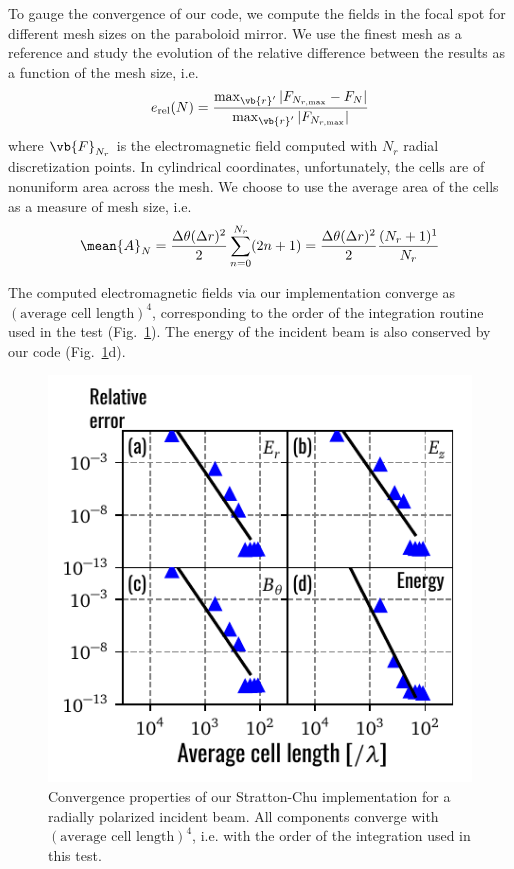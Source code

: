 \documentclass[11pt,SymmetricalJury]{inrsthesis/inrsthesis}
\begin{document}
To gauge the convergence of our code, we compute the fields in the focal spot
for different mesh sizes on the paraboloid mirror. We use the finest mesh
as a reference and study the evolution of the relative difference between
the results as a function of the mesh size, i.e.
  \begin{equation}
    e_\text{rel}(N) = \frac{\max_{\vb{r}'}|F_{N_{r,\text{max}}}-F_{N}|}
                            {\max_{\vb{r}'}|F_{N_{r,\text{max}}}|}
  \end{equation}
where $\vb{F}_{N_r}$ is the electromagnetic field computed with $N_r$
radial discretization points. In cylindrical coordinates, unfortunately,
the cells are of nonuniform area across the mesh. We choose to use the average
area of the cells as a measure of mesh size, i.e.
  \begin{equation}
    \mean{A}_N = \frac{\Delta\theta(\Delta r)^2}{2}\sum_{n=0}^{N_r} (2n+1)
               = \frac{\Delta\theta(\Delta r)^2}{2}\frac{(N_r+1)^1}{N_r}
  \end{equation}

The computed electromagnetic fields via our implementation converge as
$(\text{average cell length})^4$, corresponding to the order of the
integration routine used in the test (Fig.~\ref{fig:sc.convergence-radial}).
The energy of the incident beam is also conserved by our code (Fig.~\ref{fig:sc.convergence-radial}d).

\begin{figure}
  \centering
  \includegraphics{figs/ConvergenceAll.pdf}
  \caption[Convergence properties of our Stratton-Chu implementation (radial polarization).]
  {Convergence properties of our Stratton-Chu implementation for a radially polarized
  incident beam. All components converge with $(\text{average cell length})^4$,
  i.e. with the order of the integration used in this test.}
  \label{fig:sc.convergence-radial}
\end{figure}
\end{document}
